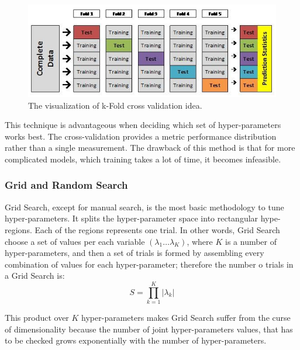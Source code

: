 \begin{figure}[h]
\centering
\includegraphics{figures/CV.PNG}
\caption{ The visualization of k-Fold cross validation idea.
\label{fig:CV}}
\end{figure}

This technique is advantageous when deciding which set of hyper-parameters works best. The cross-validation provides a metric performance distribution rather than a single measurement. The drawback of this method is that for more complicated models, which training takes a lot of time, it becomes infeasible.

\subsubsection{Grid and Random Search}
\label{sec:GS and RS}
Grid Search, except for manual search, is the most basic methodology to tune hyper-parameters. It splits the hyper-parameter space into rectangular hype-regions. Each of the regions represents one trial. In other words, Grid Search choose a set of values per each variable $(\lambda_{1} \ldots \lambda_{K})$, where $K$ is a number of hyper-parameters, and then a set of trials is formed by assembling every combination of values for each hyper-parameter; therefore the number o trials in a Grid Search is:
\begin{equation}
    S=\prod^{K}_{k=1}|\lambda_{k}|  
\end{equation}

This product over $K$ hyper-parameters makes Grid Search suffer from the curse of dimensionality because the number of joint hyper-parameters values, that has to be checked grows exponentially with the number of hyper-parameters. 

